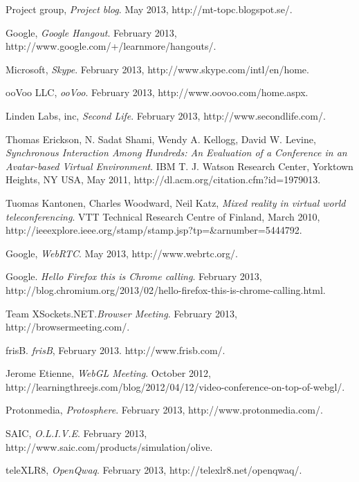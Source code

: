 \documentclass[12pt, titlepage]{article}
\begin{document}
\begin{thebibliography}{9}
  Project group,
  \emph{Project blog}.
  May 2013,
  http://mt-topc.blogspot.se/.
  
  Google,
  \emph{Google Hangout}.
  February 2013,
  http://www.google.com/+/learnmore/hangouts/.
  
  Microsoft,
  \emph{Skype}.
  February 2013,
  http://www.skype.com/intl/en/home.   
  
  ooVoo LLC,
  \emph{ooVoo}.
  February 2013,
  http://www.oovoo.com/home.aspx.  

  Linden Labs, inc,
  \emph{Second Life}.
  February 2013,
  http://www.secondlife.com/. 
   
  Thomas Erickson, N. Sadat Shami, Wendy A. Kellogg, David W. Levine,
  \emph{Synchronous Interaction Among Hundreds: An Evaluation of a Conference in an Avatar-based Virtual Environment}.
 IBM T. J. Watson Research Center, Yorktown Heights, NY USA,
  May 2011,
  http://dl.acm.org/citation.cfm?id=1979013.

  Tuomas Kantonen, Charles Woodward, Neil Katz,
  \emph{Mixed reality in virtual world teleconferencing}.
  VTT Technical Research Centre of Finland,
  March 2010,
  http://ieeexplore.ieee.org/stamp/stamp.jsp?tp=\&arnumber=5444792.

  Google,
  \emph{WebRTC}.
  May 2013,
  http://www.webrtc.org/.
  
Google. 
\emph{Hello Firefox this is Chrome calling}.
 February 2013, http://blog.chromium.org/2013/02/hello-firefox-this-is-chrome-calling.html.    
 
Team XSockets.NET.\emph{Browser Meeting}. February 2013, http://browsermeeting.com/.

 frisB. \emph{frisB}, February 2013. http://www.frisb.com/.
 
Jerome Etienne, \emph{WebGL Meeting}.
October 2012,
http://learningthreejs.com/blog/2012/04/12/video-conference-on-top-of-webgl/.	

  Protonmedia,
  \emph{Protosphere}.
  February 2013,
  http://www.protonmedia.com/.

  SAIC,
  \emph{O.L.I.V.E}.
  February 2013,\linebreak
  http://www.saic.com/products/simulation/olive.

  teleXLR8,
  \emph{OpenQwaq}.
  February 2013,
  http://telexlr8.net/openqwaq/.
  

\end{thebibliography}
\end{document}
